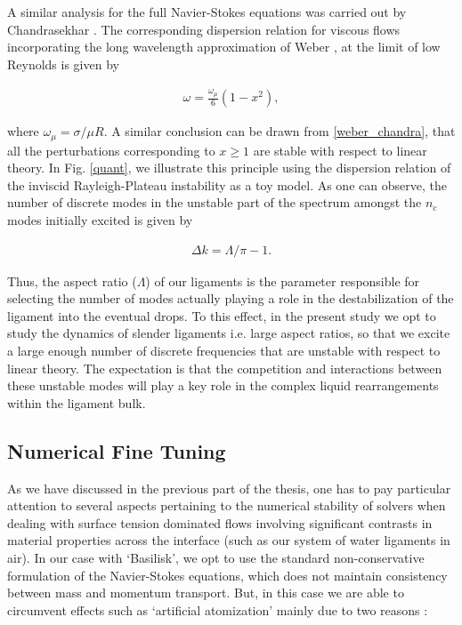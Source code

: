 A similar analysis for the full Navier-Stokes equations 
was carried out by Chandrasekhar \cite{chandra}. 
The corresponding dispersion relation for viscous 
flows incorporating the long wavelength approximation 
of Weber \cite{weber1931}, at the limit of low Reynolds is given by

\begin{align}
\omega = \frac{\omega_\mu}{6}\left(1 - x^2 \right) , 
\label{weber_chandra}
\end{align}

where $\omega_\mu = \sigma / \mu R $. 
A similar conclusion can be drawn from \eqref{weber_chandra},
that all the perturbations corresponding to $x \geq 1 $ are 
stable with respect to linear theory. 
\marginnote{
}
In Fig. \ref{quant}, we illustrate this principle using the dispersion 
relation of the inviscid Rayleigh-Plateau instability as a toy model. 
As one can observe, the number of discrete modes in the unstable part
of the spectrum amongst the $n_c$ modes initially excited is given by 

\begin{align}
 \Delta k = \Lambda / \pi - 1 .  
\end{align}

Thus, the aspect ratio ($\Lambda$) of our ligaments is the parameter 
responsible for selecting the number of modes actually playing a 
role in the destabilization of the ligament into the eventual drops. 
To this effect, in the present study we opt to study the dynamics of 
slender ligaments i.e. large aspect ratios, so that we excite a large enough 
number of discrete frequencies that are unstable with respect to linear theory. 
The expectation is that the competition and interactions 
between these unstable modes will play a key role in the
complex liquid rearrangements within the ligament bulk. 

\subsection*{Numerical Fine Tuning}
As we have discussed in the previous part of the thesis,  
one has to pay particular attention to several aspects pertaining to 
the numerical stability of solvers when dealing with surface tension 
dominated flows involving significant contrasts in material properties 
across the interface (such as our system of water ligaments in air). 
In our case with `Basilisk', we opt to use the standard non-conservative
formulation of the Navier-Stokes equations, which does not maintain 
consistency between mass and momentum transport. 
But, in this case we are able to circumvent effects such as `artificial
atomization' mainly due to two reasons :

